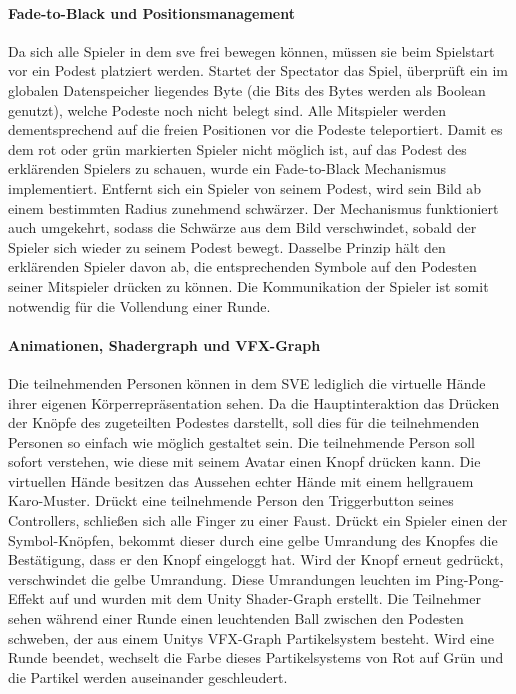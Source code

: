 \documentclass[a4paper,11pt]{article}%
\renewcommand{\\}{\vspace*{0.5\baselineskip} \newline}
\begin{document}
\paragraph{Fade-to-Black und Positionsmanagement}
	Da sich alle Spieler in dem \ac{sve} frei bewegen können, müssen sie beim Spielstart vor ein Podest platziert werden. Startet der Spectator das Spiel, überprüft ein im globalen Datenspeicher liegendes Byte (die Bits des Bytes werden als Boolean genutzt), welche Podeste noch nicht belegt sind. Alle Mitspieler werden dementsprechend auf die freien Positionen vor die Podeste teleportiert. Damit es dem rot oder grün markierten Spieler nicht möglich ist, auf das Podest des erklärenden Spielers zu schauen, wurde ein Fade-to-Black Mechanismus implementiert. Entfernt sich ein Spieler von seinem Podest, wird sein Bild ab einem bestimmten Radius zunehmend schwärzer. Der Mechanismus funktioniert auch umgekehrt, sodass die Schwärze aus dem Bild verschwindet, sobald der Spieler sich wieder zu seinem Podest bewegt. Dasselbe Prinzip hält den erklärenden Spieler davon ab, die entsprechenden Symbole auf den Podesten seiner Mitspieler drücken zu können. Die Kommunikation der Spieler ist somit notwendig für die Vollendung einer Runde.

\paragraph{Animationen, Shadergraph und VFX-Graph}
Die teilnehmenden Personen können in dem SVE lediglich die virtuelle Hände ihrer eigenen Körperrepräsentation sehen. Da die Hauptinteraktion das Drücken der Knöpfe des zugeteilten Podestes darstellt, soll dies für die teilnehmenden Personen so einfach wie möglich gestaltet sein. Die teilnehmende Person soll sofort verstehen, wie diese mit seinem Avatar einen Knopf drücken kann. Die virtuellen Hände besitzen das Aussehen echter Hände mit einem hellgrauem Karo-Muster. Drückt eine teilnehmende Person den Triggerbutton seines Controllers, schließen sich alle Finger zu einer Faust.
Drückt ein Spieler einen der Symbol-Knöpfen, bekommt dieser durch eine gelbe Umrandung des Knopfes die Bestätigung, dass er den Knopf eingeloggt hat. Wird der Knopf erneut gedrückt, verschwindet die gelbe Umrandung. Diese Umrandungen leuchten im Ping-Pong-Effekt auf und wurden mit dem Unity Shader-Graph erstellt.
Die Teilnehmer sehen während einer Runde einen leuchtenden Ball zwischen den Podesten schweben, der aus einem Unitys VFX-Graph Partikelsystem besteht. Wird eine Runde beendet, wechselt die Farbe dieses Partikelsystems von Rot auf Grün und die Partikel werden auseinander geschleudert. 
\end{document}
